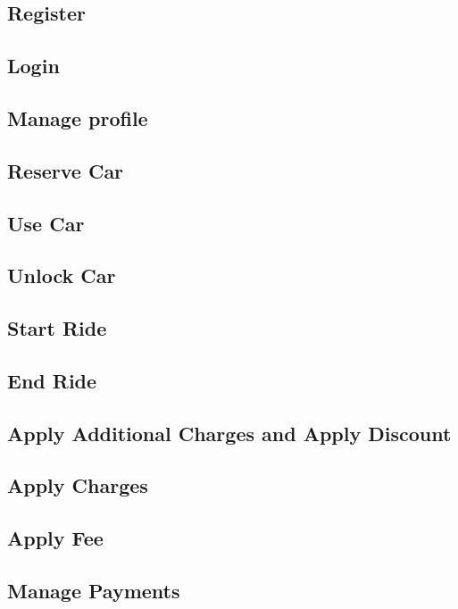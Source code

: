 \subsection{Register}


\subsection{Login}


\subsection{Manage profile}


\subsection{Reserve Car}


\subsection{Use Car}


\subsection{Unlock Car} \label{unlock_car_section}


\subsection{Start Ride} \label{start_ride_section}


\subsection{End Ride} \label{end_ride_section}


\subsection{Apply Additional Charges and Apply Discount}


\subsection{Apply Charges}


\subsection{Apply Fee}


\subsection{Manage Payments} \label{man_pay}
